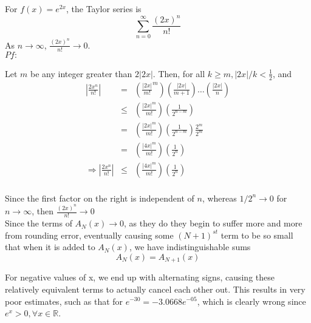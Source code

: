 \documentclass[12pt]{article}
\begin{document}
For \(f(x) = e^{2x}\), the Taylor series is \[\sum_{n=0}^{\infty} \frac{(2x)^{n}}{n!}\] As \(n\rightarrow\infty\), \(\frac{(2x)^{n}}{n!} \rightarrow 0\).\\

\(\underline{Pf:}\)

Let \(m\) be any integer greater than \(2\left|2x\right|\).  Then, for all \(k \geq m, \left|2x\right| / k < \frac{1}{2}\), and
\begin{eqnarray*}
\left|\frac{2x^{n}}{n!}\right| & = & \left(\frac{\left|2x\right|}{m!}^{m}\right)\left(\frac{\left|2x\right|}{m+1}\right)\ldots\left(\frac{\left|2x\right|}{n}\right)\\
& \leq & \left(\frac{\left|2x\right|^{m}}{m!}\right)\left(\frac{1}{2^{n-m}}\right)\\
& = & \left(\frac{\left|2x\right|^{m}}{m!}\right)\left(\frac{1}{2^{n-m}}\right)\frac{2^m}{2^m}\\
& = & \left(\frac{\left|4x\right|^{m}}{m!}\right)\left(\frac{1}{2^{n}}\right)\\
\Rightarrow\left|\frac{2x^{n}}{n!}\right| & \leq & \left(\frac{\left|4x\right|^{m}}{m!}\right)\left(\frac{1}{2^{n}}\right)\\
\end{eqnarray*}

Since the first factor on the right is independent of \(n\), whereas \(1/2^n\rightarrow 0\) for \(n \rightarrow \infty\), then \(\frac{(2x)^{n}}{n!} \rightarrow 0\)\\

Since the terms of \(A_{N}(x) \rightarrow 0\), as they do they begin to suffer more and more from rounding error, eventually causing some \((N+1)^{st}\) term to be so small that when it is added to \(A_{N}(x)\), we have indistinguishable sums \[A_{N}(x) = A_{N+1}(x)\]

For negative values of x, we end up with alternating signs, causing these relatively equivalent terms to actually cancel each other out.  This results in very poor estimates, such as that for \(e^{-30} = -3.0668e^{-05}\), which is clearly wrong since \(e^{x} > 0, \forall x \in \mathbb{R}\).
\end{document}

